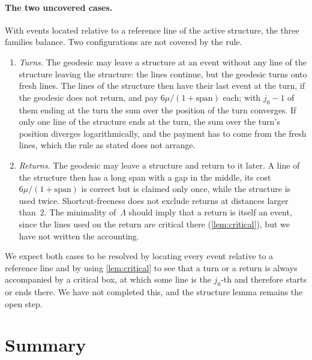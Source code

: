 \documentclass[11pt,letterpaper]{article}
\begin{document}
\paragraph{The two uncovered cases.} With events located relative to a reference line of the active structure, the three families balance. Two configurations are not covered by the rule.
\begin{enumerate}
  \item \emph{Turns.} The geodesic may leave a structure at an event without any line of the structure leaving the structure: the lines continue, but the geodesic turns onto fresh lines. The lines of the structure then have their last event at the turn, if the geodesic does not return, and pay $6\mu/(1+\text{span})$ each; with $j_0-1$ of them ending at the turn the sum over the position of the turn converges. If only one line of the structure ends at the turn, the sum over the turn's position diverges logarithmically, and the payment has to come from the fresh lines, which the rule as stated does not arrange.
  \item \emph{Returns.} The geodesic may leave a structure and return to it later. A line of the structure then has a long span with a gap in the middle, its cost $6\mu/(1+\text{span})$ is correct but is claimed only once, while the structure is used twice. Shortcut-freeness does not exclude returns at distances larger than~$2$. The minimality of~$\Lambda$ should imply that a return is itself an event, since the lines used on the return are critical there (\cref{lem:critical}), but we have not written the accounting.
\end{enumerate}
We expect both cases to be resolved by locating every event relative to a reference line and by using \cref{lem:critical} to see that a turn or a return is always accompanied by a critical box, at which some line is the $j_0$-th and therefore starts or ends there. We have not completed this, and the structure lemma remains the open step.

\section{Summary}
\label{sec:summary}
\end{document}
